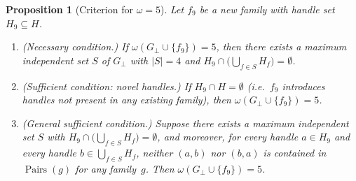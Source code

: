 \documentclass[preprint,12pt]{elsarticle}
\newtheorem{proposition}[theorem]{Proposition}
\theoremstyle{definition}
\theoremstyle{remark}
\DeclareMathOperator{\Pairs}{Pairs}
\begin{document}
\begin{proposition}[Criterion for $\omega = 5$]\label{prop:omega5}
Let $f_9$ be a new family with handle set $H_9 \subseteq H$.
\begin{enumerate}[nosep,label=(\alph*)]
\item\label{item:omega5-nec}
  \textup{(Necessary condition.)}
  If $\omega(G_\perp \cup \{f_9\}) = 5$, then there exists a
  maximum independent set $S$ of $G_\perp$ with $|S| = 4$ and
  $H_9 \cap \bigl(\bigcup_{f \in S} H_f\bigr) = \emptyset$.
\item\label{item:omega5-novel}
  \textup{(Sufficient condition: novel handles.)}
  If $H_9 \cap H = \emptyset$ (i.e.\ $f_9$ introduces handles not
  present in any existing family), then
  $\omega(G_\perp \cup \{f_9\}) = 5$.
\item\label{item:omega5-general}
  \textup{(General sufficient condition.)}
  Suppose there exists a maximum independent set $S$ with
  $H_9 \cap \bigl(\bigcup_{f \in S} H_f\bigr) = \emptyset$, and
  moreover, for every handle $a \in H_9$ and every handle
  $b \in \bigcup_{f \in S} H_f$, neither $(a, b)$ nor $(b, a)$
  is contained in $\Pairs(g)$ for any family~$g$.  Then
  $\omega(G_\perp \cup \{f_9\}) = 5$.
\end{enumerate}
\end{proposition}
\end{document}
